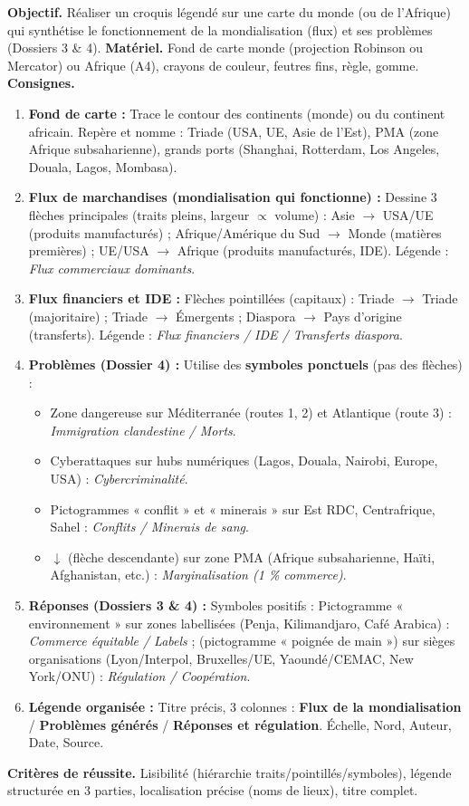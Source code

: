 \documentclass[11pt]{article}
\begin{document}
\begin{experience}
\textbf{Objectif.} Réaliser un croquis légendé sur une carte du monde (ou de l'Afrique) qui synthétise le fonctionnement de la mondialisation (flux) et ses problèmes (Dossiers 3 \& 4).
\textbf{Matériel.} Fond de carte monde (projection Robinson ou Mercator) ou Afrique (A4), crayons de couleur, feutres fins, règle, gomme.
\textbf{Consignes.}
\begin{enumerate}
\item \textbf{Fond de carte :} Trace le contour des continents (monde) ou du continent africain. Repère et nomme : Triade (USA, UE, Asie de l'Est), PMA (zone Afrique subsaharienne), grands ports (Shanghai, Rotterdam, Los Angeles, Douala, Lagos, Mombasa).
\item \textbf{Flux de marchandises (mondialisation qui fonctionne) :} Dessine 3 flèches principales (traits pleins, largeur $\propto$ volume) : Asie $\to$ USA/UE (produits manufacturés) ; Afrique/Amérique du Sud $\to$ Monde (matières premières) ; UE/USA $\to$ Afrique (produits manufacturés, IDE). Légende : \emph{Flux commerciaux dominants}.
\item \textbf{Flux financiers et IDE :} Flèches pointillées (capitaux) : Triade $\to$ Triade (majoritaire) ; Triade $\to$ Émergents ; Diaspora $\to$ Pays d'origine (transferts). Légende : \emph{Flux financiers / IDE / Transferts diaspora}.
\item \textbf{Problèmes (Dossier 4) :} Utilise des \textbf{symboles ponctuels} (pas des flèches) :
\begin{itemize}
\item Zone dangereuse sur Méditerranée (routes 1, 2) et Atlantique (route 3) : \emph{Immigration clandestine / Morts}.
\item Cyberattaques sur hubs numériques (Lagos, Douala, Nairobi, Europe, USA) : \emph{Cybercriminalité}.
\item Pictogrammes « conflit » et « minerais » sur Est RDC, Centrafrique, Sahel : \emph{Conflits / Minerais de sang}.
\item $\downarrow$ (flèche descendante) sur zone PMA (Afrique subsaharienne, Haïti, Afghanistan, etc.) : \emph{Marginalisation (1 \% commerce)}.
\end{itemize}
\item \textbf{Réponses (Dossiers 3 \& 4) :} Symboles positifs : Pictogramme « environnement » sur zones labellisées (Penja, Kilimandjaro, Café Arabica) : \emph{Commerce équitable / Labels} ; (pictogramme « poignée de main ») sur sièges organisations (Lyon/Interpol, Bruxelles/UE, Yaoundé/CEMAC, New York/ONU) : \emph{Régulation / Coopération}.
\item \textbf{Légende organisée :} Titre précis, 3 colonnes : \textbf{Flux de la mondialisation} / \textbf{Problèmes générés} / \textbf{Réponses et régulation}. Échelle, Nord, Auteur, Date, Source.
\end{enumerate}
\textbf{Critères de réussite.} Lisibilité (hiérarchie traits/pointillés/symboles), légende structurée en 3 parties, localisation précise (noms de lieux), titre complet.
\end{experience}
\end{document}
